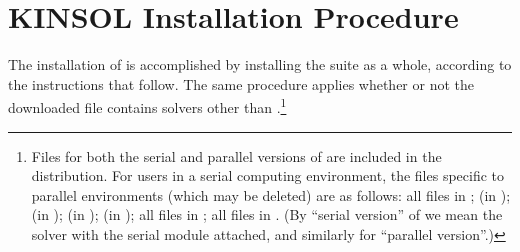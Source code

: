\chapter{KINSOL Installation Procedure}\label{c:install}

The installation of {\kinsol} is accomplished by installing the
{\sundials} suite as a whole, according to the instructions that
follow. The same procedure applies whether or not the downloaded
file contains solvers other than {\kinsol}.\footnote{Files for both
the serial and parallel versions of {\kinsol} are included in the
distribution. For users in a serial computing environment, the files
specific to parallel environments (which may be deleted) are as follows:
all files in ;
 (in );
 (in );
 (in );
 (in );
all files in ;
all files in .
(By ``serial version'' of {\kinsol} we mean the {\kinsol} solver with the
serial {\nvector} module attached, and similarly for ``parallel version''.)}

